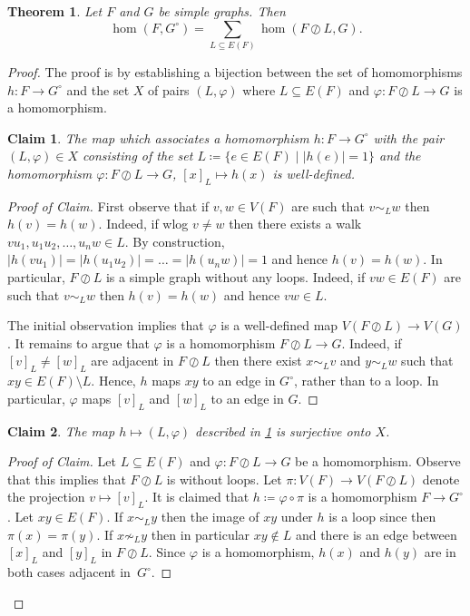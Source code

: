 \documentclass[3p,final]{elsarticle}
\renewcommand\phi\varphi
\newtheorem{theorem}{Theorem}
\newtheorem{claim}{Claim}[theorem]
\newenvironment{claimproof}[1][Proof of Claim]{\begin{proof}[#1] \renewcommand{\qedsymbol}{$\lrcorner$}}{ \end{proof}}
\begin{document}
	\begin{theorem} \label{lem:looping}
		Let $F$ and $G$ be simple graphs. Then
		\[
		\hom(F, G^\circ) = \sum_{L \subseteq E(F)} \hom(F \oslash L, G).
		\]
	\end{theorem}
	\begin{proof}The proof is by establishing a bijection between the set of homomorphisms $h \colon F \to G^\circ$ and the set $X$ of pairs $(L, \phi)$ where $L \subseteq E(F)$ and $\phi \colon F \oslash L \to G$ is a homomorphism.	
	
	\begin{claim} \label{cl:looping-map}
		The map which associates a homomorphism $h \colon F \to G^\circ$ with the pair $(L, \phi) \in X$ consisting of the set $L \coloneqq \{e \in E(F) \mid |h(e)| = 1\}$ and the homomorphism $\phi \colon F \oslash L \to G$, $[x]_L \mapsto h(x)$ is well-defined.
	\end{claim}
	\begin{claimproof}
		First observe that if $v,w  \in V(F)$ are such that $v \sim_L w$ then $h(v) = h(w)$. Indeed, if wlog $v \neq w$ then there exists a walk $vu_1, u_1u_2, \dots, u_nw \in L$. By construction, $|h(vu_1)| = |h(u_1u_2)| = \dots = |h(u_nw)| = 1$ and hence $h(v) = h(w)$.
		In particular, $F \oslash L$ is a simple graph without any loops. Indeed, if $vw \in E(F)$ are such that $v \sim_L w$ then $h(v) = h(w)$ and hence $vw \in L$.
		
		The initial observation implies that $\phi$ is a well-defined map $V(F \oslash L) \to V(G)$. It remains to argue that $\phi$ is a homomorphism $F  \oslash L \to G$. 
		Indeed, if $[v]_L \neq [w]_L$ are adjacent in $F \oslash L$ then there exist $x \sim_L v$ and $y \sim_L w$ such that $xy \in E(F) \setminus L$. Hence, $h$ maps $xy$ to an edge in $G^\circ$, rather than to a loop. In particular, $\phi$ maps $[v]_L$ and $[w]_L$ to an edge in $G$.
	\end{claimproof}
	
	\begin{claim}
		The map $h \mapsto (L, \phi)$ described in \cref{cl:looping-map} is surjective onto $X$.
	\end{claim}
	\begin{claimproof}
		Let $L \subseteq E(F)$ and $\phi \colon F \oslash L \to G$ be a homomorphism. Observe that this implies that $F \oslash L$ is without loops. 
		Let $\pi \colon V(F) \to V(F \oslash L)$ denote the projection $v \mapsto [v]_L$.
		It is claimed that $h \coloneqq \phi \circ \pi$ is a homomorphism $F \to G^\circ$. Let $xy \in E(F)$. If $x \sim_L y$ then the image of $xy$ under $h$ is a loop since then $\pi(x) = \pi(y)$.
		If $x \not\sim_L y$ then in particular $xy \not\in L$ and there is an edge between $[x]_L$ and $[y]_L$ in $F \oslash L$. Since $\phi$ is a homomorphism, $h(x)$ and $h(y)$ are in both cases adjacent in~$G^\circ$.
		

\end{claimproof}
\end{proof}
\end{document}
